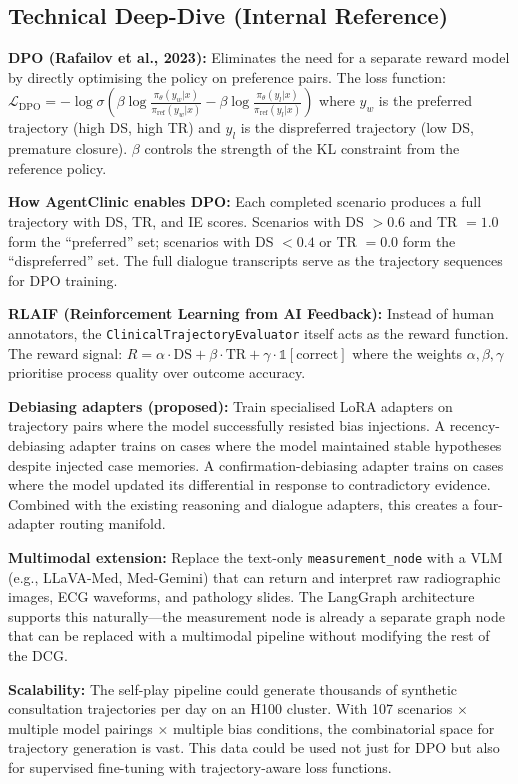 \documentclass[12pt]{article}
\begin{document}
  \subsection*{Technical Deep-Dive (Internal Reference)}
  {\color{techgray}
  \textbf{DPO (Rafailov et al., 2023):} Eliminates the need for a separate reward model by directly optimising the policy on preference pairs. The loss function:
  $\mathcal{L}_{\text{DPO}} = -\log \sigma\left(\beta \log \frac{\pi_\theta(y_w | x)}{\pi_{\text{ref}}(y_w | x)} - \beta \log \frac{\pi_\theta(y_l | x)}{\pi_{\text{ref}}(y_l | x)}\right)$
  where $y_w$ is the preferred trajectory (high DS, high TR) and $y_l$ is the dispreferred trajectory (low DS, premature closure). $\beta$ controls the strength of the KL constraint from the reference policy.

  \textbf{How AgentClinic enables DPO:} Each completed scenario produces a full trajectory with DS, TR, and IE scores. Scenarios with DS $> 0.6$ and TR $= 1.0$ form the ``preferred'' set; scenarios with DS $< 0.4$ or TR $= 0.0$ form the ``dispreferred'' set. The full dialogue transcripts serve as the trajectory sequences for DPO training.

  \textbf{RLAIF (Reinforcement Learning from AI Feedback):} Instead of human annotators, the \texttt{ClinicalTrajectoryEvaluator} itself acts as the reward function. The reward signal: $R = \alpha \cdot \text{DS} + \beta \cdot \text{TR} + \gamma \cdot \mathbb{1}[\text{correct}]$ where the weights $\alpha, \beta, \gamma$ prioritise process quality over outcome accuracy.

  \textbf{Debiasing adapters (proposed):} Train specialised LoRA adapters on trajectory pairs where the model successfully resisted bias injections. A recency-debiasing adapter trains on cases where the model maintained stable hypotheses despite injected case memories. A confirmation-debiasing adapter trains on cases where the model updated its differential in response to contradictory evidence. Combined with the existing reasoning and dialogue adapters, this creates a four-adapter routing manifold.

  \textbf{Multimodal extension:} Replace the text-only \texttt{measurement\_node} with a VLM (e.g., LLaVA-Med, Med-Gemini) that can return and interpret raw radiographic images, ECG waveforms, and pathology slides. The LangGraph architecture supports this naturally---the measurement node is already a separate graph node that can be replaced with a multimodal pipeline without modifying the rest of the DCG.

  \textbf{Scalability:} The self-play pipeline could generate thousands of synthetic consultation trajectories per day on an H100 cluster. With 107 scenarios $\times$ multiple model pairings $\times$ multiple bias conditions, the combinatorial space for trajectory generation is vast. This data could be used not just for DPO but also for supervised fine-tuning with trajectory-aware loss functions.
  }
\end{document}

